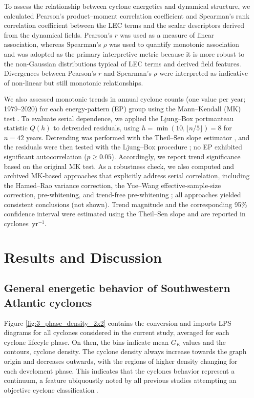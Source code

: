 \documentclass[pdflatex,sn-chicago]{sn-jnl}%
\theoremstyle{plain}
\theoremstyle{definition}
\theoremstyle{remark}
\theoremstyle{definition}
\begin{document}
To assess the relationship between cyclone energetics and dynamical structure, we calculated Pearson's product--moment correlation coefficient \citep{pearson1920notes} and Spearman's rank correlation coefficient \citep{spearman1987proof} between the LEC terms and the scalar descriptors derived from the dynamical fields. Pearson's \(r\) was used as a measure of linear association, whereas Spearman's \(\rho\) was used to quantify monotonic association and was adopted as the primary interpretive metric because it is more robust to the non-Gaussian distributions typical of LEC terms and derived field features. Divergences between Pearson's \(r\) and Spearman's \(\rho\) were interpreted as indicative of non-linear but still monotonic relationships. 

We also assessed monotonic trends in annual cyclone counts (one value per year; 1979--2020) for each energy-pattern (EP) group using the Mann--Kendall (MK) test \citep{mann1945nonparametric,kendall1948rank}. To evaluate serial dependence, we applied the Ljung--Box portmanteau statistic $Q(h)$ to detrended residuals, using $h=\min(10,\lfloor n/5\rfloor)=8$ for $n=42$ years. Detrending was performed with the Theil--Sen slope estimator \citep{sen1968estimates}, and the residuals were then tested with the Ljung--Box procedure \citep{ljung1978measure}; no EP exhibited significant autocorrelation ($p\ge 0.05$). Accordingly, we report trend significance based on the original MK test. As a robustness check, we also computed and archived MK-based approaches that explicitly address serial correlation, including the Hamed--Rao variance correction, the Yue--Wang effective-sample-size correction, pre-whitening, and trend-free pre-whitening \citep{KulkarniVonStorch1995,hamed1998modified,YueEtAl2002_TFPW,YueWang2004}; all approaches yielded consistent conclusions (not shown). Trend magnitude and the corresponding 95\% confidence interval were estimated using the Theil--Sen slope and are reported in cyclones~yr$^{-1}$.


\section{Results and Discussion}\label{sec:results}

\subsection{General energetic behavior of Southwestern Atlantic cyclones}

Figure \ref{fig:3_phase_density_2x2} contains the conversion and imports LPS diagrams for all cyclones considered in the current study, averaged for each cyclone lifecyle phase. On then, the bins indicate mean $G_E$ values and the contours, cyclone density. The cyclone density always increase towards the graph origin and decreases outwards, with the regions of higher density changing for each develoment phase. This indicates that the cyclones behavior represent a continuum, a feature ubiquoustly noted by all previous studies attempting an objective cyclone classification \citet[e.g.][]{hart2003cyclone,yanase2014parameter,graf2017objective,dekker2018characteristics,corner2025classification}.
\end{document}
